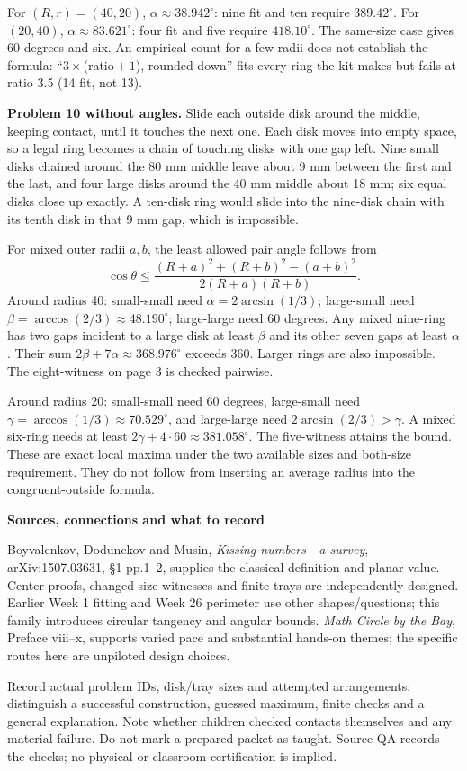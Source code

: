 \documentclass[11pt]{article}
\newcommand{\heading}[1]{\par\textbf{#1}\par}
\begin{document}
For $(R,r)=(40,20)$, $\alpha\approx 38.942^\circ$: nine fit and ten require $389.42^\circ$. For $(20,40)$, $\alpha\approx 83.621^\circ$: four fit and five require $418.10^\circ$. The same-size case gives 60 degrees and six. An empirical count for a few radii does not establish the formula: ``$3\times{}$(ratio${}+1$), rounded down'' fits every ring the kit makes but fails at ratio 3.5 (14 fit, not 13).

\textbf{Problem 10 without angles.} Slide each outside disk around the middle, keeping contact, until it touches the next one. Each disk moves into empty space, so a legal ring becomes a chain of touching disks with one gap left. Nine small disks chained around the 80 mm middle leave about 9 mm between the first and the last, and four large disks around the 40 mm middle about 18 mm; six equal disks close up exactly. A ten-disk ring would slide into the nine-disk chain with its tenth disk in that 9 mm gap, which is impossible.

For mixed outer radii $a,b$, the least allowed pair angle follows from
\[
\cos\theta\le\frac{(R+a)^2+(R+b)^2-(a+b)^2}{2(R+a)(R+b)}.
\]
Around radius 40: small-small need $\alpha=2\arcsin(1/3)$; large-small need $\beta=\arccos(2/3)\approx 48.190^\circ$; large-large need 60 degrees. Any mixed nine-ring has two gaps incident to a large disk at least $\beta$ and its other seven gaps at least $\alpha$. Their sum $2\beta+7\alpha\approx 368.976^\circ$ exceeds 360. Larger rings are also impossible. The eight-witness on page 3 is checked pairwise.

Around radius 20: small-small need 60 degrees, large-small need $\gamma=\arccos(1/3)\approx 70.529^\circ$, and large-large need $2\arcsin(2/3)>\gamma$. A mixed six-ring needs at least $2\gamma+4\cdot 60\approx 381.058^\circ$. The five-witness attains the bound. These are exact local maxima under the two available sizes and both-size requirement. They do not follow from inserting an average radius into the congruent-outside formula.

\heading{Sources, connections and what to record}
Boyvalenkov, Dodunekov and Musin, \emph{Kissing numbers---a survey}, arXiv:1507.03631, \S1 pp.1--2, supplies the classical definition and planar value. Center proofs, changed-size witnesses and finite trays are independently designed. Earlier Week 1 fitting and Week 26 perimeter use other shapes/questions; this family introduces circular tangency and angular bounds. \emph{Math Circle by the Bay}, Preface viii--x, supports varied pace and substantial hands-on themes; the specific routes here are unpiloted design choices.

Record actual problem IDs, disk/tray sizes and attempted arrangements; distinguish a successful construction, guessed maximum, finite checks and a general explanation. Note whether children checked contacts themselves and any material failure. Do not mark a prepared packet as taught. Source QA records the checks; no physical or classroom certification is implied.
\end{document}

